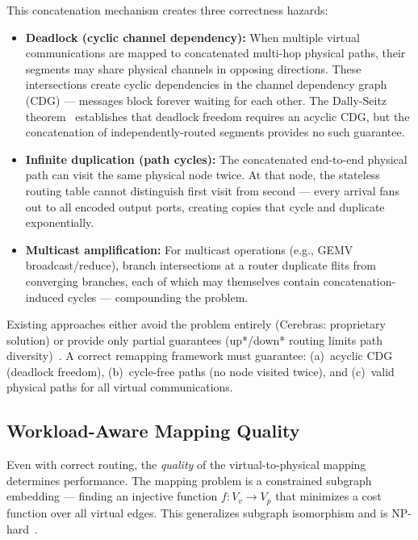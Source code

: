 \documentclass[sigplan,anonymous,review,nonacm]{acmart}
\begin{document}
This concatenation mechanism creates three correctness hazards:

\begin{itemize}
\item \textbf{Deadlock (cyclic channel dependency):} When multiple virtual communications are mapped to concatenated multi-hop physical paths, their segments may share physical channels in opposing directions. These intersections create cyclic dependencies in the channel dependency graph (CDG) --- messages block forever waiting for each other. The Dally-Seitz theorem~\cite{dally1987deadlock} establishes that deadlock freedom requires an acyclic CDG, but the concatenation of independently-routed segments provides no such guarantee.

\item \textbf{Infinite duplication (path cycles):} The concatenated end-to-end physical path can visit the same physical node twice. At that node, the stateless routing table cannot distinguish first visit from second --- every arrival fans out to all encoded output ports, creating copies that cycle and duplicate exponentially.

\item \textbf{Multicast amplification:} For multicast operations (e.g., GEMV broadcast/reduce), branch intersections at a router duplicate flits from converging branches, each of which may themselves contain concatenation-induced cycles --- compounding the problem.
\end{itemize}

Existing approaches either avoid the problem entirely (Cerebras: proprietary solution) or provide only partial guarantees (up*/down* routing limits path diversity)~\cite{ariadne2011, udirec2013}. A correct remapping framework must guarantee: (a)~acyclic CDG (deadlock freedom), (b)~cycle-free paths (no node visited twice), and (c)~valid physical paths for all virtual communications.

\subsection{Workload-Aware Mapping Quality}
\label{sec:ch-quality}

Even with correct routing, the \emph{quality} of the virtual-to-physical mapping determines performance. The mapping problem is a constrained subgraph embedding --- finding an injective function $f: V_v \to V_p$ that minimizes a cost function over all virtual edges. This generalizes subgraph isomorphism and is NP-hard~\cite{rost2020hardness}.
\end{document}
